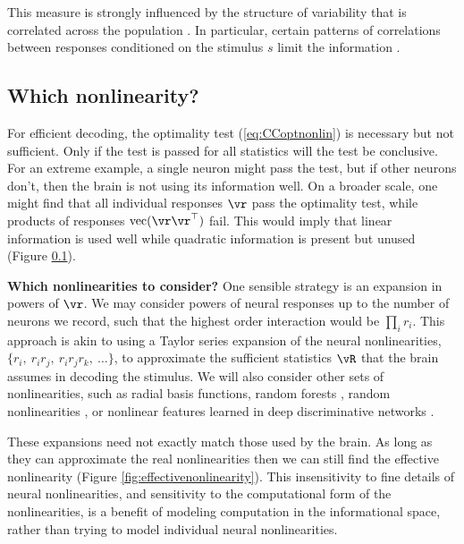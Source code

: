 \documentclass[11pt,twocolumn]{article}
\begin{document}
This measure is strongly influenced by the structure of variability that is correlated across the population \cite{Abbott1999}. In particular, certain patterns of correlations between responses conditioned on the stimulus $s$ limit the information \cite{zohary1994,moreno:2014information,GrabskaBarwinska,kanitscheider}.



\subsection{Which nonlinearity?}

For efficient decoding, the optimality test (\ref{eq:CCoptnonlin}) is necessary but not sufficient. Only if the test is passed for all statistics will the test be conclusive. For an extreme example, a single neuron might pass the test, but if other neurons don't, then the brain is not using its information well. On a broader scale, one might find that all individual responses $\vr$ pass the optimality test, while products of responses ${\rm vec}(\vr\vr^\top)$ fail. This would imply that  linear information is used well while quadratic information is present but unused (Figure \ref{}).







{\bf Which nonlinearities to consider?} One sensible strategy is an expansion in powers of $\vr$. We may consider powers of neural responses up to the number of neurons we record, such that the highest order interaction would be $\prod_i r_i$. This approach is akin to using a Taylor series expansion of the neural nonlinearities, $\{r_i,\ r_ir_j,\ r_ir_jr_k,\ \ldots\}$, to approximate the sufficient statistics $\vR$ that the brain assumes in decoding the stimulus. We will also consider other sets of nonlinearities, such as radial basis functions, random forests \cite{}, random nonlinearities \cite{raju2015marginalization,rigotti2010internal,rigotti2013importance}, or nonlinear features learned in deep discriminative networks \cite{dicarlo2007untangling,patel2015probabilistic}.

These expansions need not exactly match those used by the brain. As long as they can approximate the real nonlinearities then we can still find the effective nonlinearity (Figure \ref{fig:effectivenonlinearity}). This insensitivity to fine details of neural nonlinearities, and sensitivity to the computational form of the nonlinearities, is a benefit of modeling computation in the informational space, rather than trying to model individual neural nonlinearities.
\end{document}
